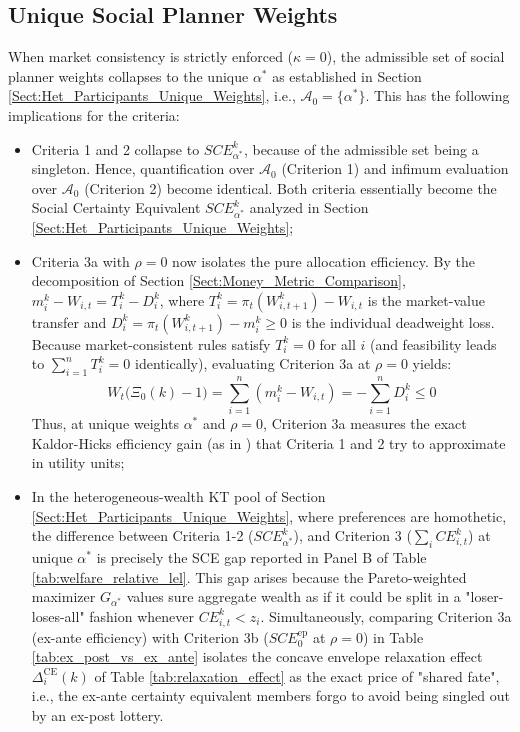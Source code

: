 \documentclass[11pt,a4paper]{article}
\theoremstyle{definition}
\theoremstyle{plain}
\theoremstyle{remark}
\newcommand{\1}{\mathbf{1}}
\begin{document}
\subsection{Unique Social Planner Weights}
When market consistency is strictly enforced ($\kappa=0$), the admissible set of social planner weights collapses to the unique $\alpha^*$ as established in Section \ref{Sect:Het_Participants_Unique_Weights}, i.e., $\mathcal{A}_0 = \{\alpha^*\}$. This has the following implications for the criteria:
\begin{itemize}
    \item Criteria 1 and 2 collapse to $SCE_{\alpha^*}^k$, because of the admissible set being a singleton. Hence, quantification over $\mathcal{A}_0$ (Criterion 1) and infimum evaluation over $\mathcal{A}_0$ (Criterion 2) become identical. Both criteria essentially become the Social Certainty Equivalent $SCE_{\alpha^*}^k$ analyzed in Section \ref{Sect:Het_Participants_Unique_Weights};
    \item Criteria 3a with $\rho=0$ now isolates the pure allocation efficiency. By the decomposition of Section \ref{Sect:Money_Metric_Comparison}, $m_i^k - W_{i,t} = T_i^k - D_i^k$, where $T_i^k = \pi_t(W_{i,t+1}^k) - W_{i,t}$ is the market-value transfer and $D_i^k = \pi_t(W_{i,t+1}^k) - m_i^k \ge 0$ is the individual deadweight loss. Because market-consistent rules satisfy $T_i^k = 0$ for all $i$ (and feasibility leads to $\sum_{i=1}^n T_i^k = 0$ identically), evaluating Criterion 3a at $\rho = 0$ yields:
    \begin{equation*}
        W_t \big( \Xi_0(k) - 1 \big) = \sum_{i=1}^n (m_i^k - W_{i,t}) = -\sum_{i=1}^n D_i^k \le 0
    \end{equation*}
    Thus, at unique weights $\alpha^*$ and $\rho=0$, Criterion 3a measures the exact Kaldor-Hicks efficiency gain (as in \citet{DavilaSchaab2025}) that Criteria 1 and 2 try to approximate in utility units;
    \item In the heterogeneous-wealth KT pool of Section \ref{Sect:Het_Participants_Unique_Weights}, where preferences are homothetic, the difference between Criteria 1-2 ($SCE_{\alpha^*}^k$), and Criterion 3 ($\sum_i CE_{i,t}^k$) at unique $\alpha^*$ is precisely the SCE gap reported in Panel B of Table \ref{tab:welfare_relative_lel}. This gap arises because the Pareto-weighted maximizer $G_{\alpha^*}$ values sure aggregate wealth as if it could be split in a "loser-loses-all" fashion whenever $CE_{i,t}^k < z_i$. Simultaneously, comparing Criterion 3a (ex-ante efficiency) with Criterion 3b ($SCE_0^{\text{ep}}$ at $\rho = 0$) in Table \ref{tab:ex_post_vs_ex_ante} isolates the concave envelope relaxation effect $\Delta_i^{\text{CE}}(k)$ of Table \ref{tab:relaxation_effect} as the exact price of "shared fate", i.e., the ex-ante certainty equivalent members forgo to avoid being singled out by an ex-post lottery.
\end{itemize}
\end{document}
